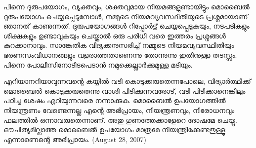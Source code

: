 പിന്നെ ദുരുപയോഗം, വ്യക്തവും, ശക്തവുമായ നിയമങ്ങളുണ്ടായിട്ടും മൊബൈല്‍ ദുരുപയോഗം ചെയ്യപ്പെടുമ്പോള്‍,
 നമ്മുടെ നിയമവ്യവസ്ഥിതിയുടെ പ്രശ്നമായാണ് ഞാനത് കാണുന്നത്. ദുരുപയോഗങ്ങള്‍ റിപ്പോര്‍ട്ട് ചെയ്യപ്പെടുകയും,
 നടപടികളും ശിക്ഷകളും ഉണ്ടാവുകയും ചെയ്താല്‍ ഒരു പരിധി വരെ ഇത്തരം പ്രശ്നങ്ങള്‍ കുറക്കാനാവും. 
സാങ്കേതിക വിദ്യക്കനുസരിച്ച് നമ്മുടെ നിയമവ്യവസ്ഥിതിയും ഭരണസംവിധാനങ്ങളും വളരാത്തതാണെന്നു തോന്നുന്നു
 ഇതിനുള്ള തടസ്സം. പിന്നെ പോലീസിനോടിടപെടാന്‍ നമുക്കെല്ലാര്‍ക്കുമുള്ള മടിയും.

എറിയാനറിയാവുന്നവന്റെ കയ്യില്‍ വടി കൊടുക്കരുതെന്നപോലെ, വിദ്യാര്‍ത്ഥിക്ക് മൊബൈല്‍ കൊടുക്കരുതെന്നു വാശി 
പിടിക്കുന്നവരോട്, വടി പിടിക്കാനെങ്കിലും പഠിച്ച ശേഷം എറിയുന്നവരെ നന്നാക്കുക. മൊബൈല്‍ ഉപയോഗത്തില്‍ നിയന്ത്രണം 
വേണ്ടെന്നല്ല എന്റെ അഭിപ്രായം, നിയന്ത്രണവും, നിരോധനവും ഫലത്തില്‍ ഒന്നാവരുതെന്നാണ്. അതു ഗുണത്തേക്കാളേറെ 
ദോഷമേ ചെയ്യൂ. ഔചിത്യമില്ലാത്ത മൊബൈല്‍ ഉപയോഗം മാത്രമേ നിയന്ത്രിക്കേണ്ടതുള്ളൂ എന്നാണെന്റെ അഭിപ്രായം.
(August 28, 2007)
\newpage
